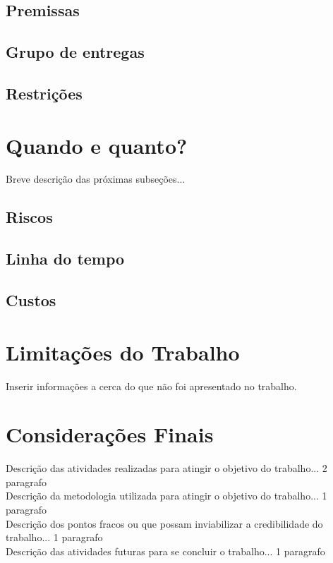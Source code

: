 \documentclass[12pt]{article}
\begin{document}
\subsection{Premissas}

\subsection{Grupo de entregas}

\subsection{Restrições}


\section{Quando e quanto?} \label{sec:quandoquanto}
Breve descrição das próximas subseções...\\




\subsection{Riscos}

\subsection{Linha do tempo}

\subsection{Custos}


\section{Limitações do Trabalho} \label{sec:ameacas}

Inserir informações a cerca do que não foi apresentado no trabalho.



\section{Considerações Finais} \label{sec:consideracoes}
Descrição das atividades realizadas para atingir o objetivo do trabalho... 2 paragrafo\\
Descrição da metodologia utilizada para atingir o objetivo do trabalho... 1 paragrafo\\
Descrição dos pontos fracos ou que possam inviabilizar a credibilidade do trabalho... 1 paragrafo\\
Descrição das atividades futuras para se concluir o trabalho... 1 paragrafo\\
\end{document}
